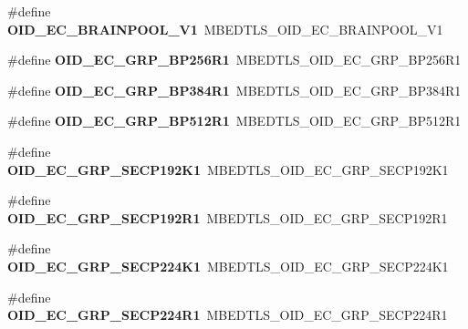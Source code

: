 \begin{DoxyCompactItemize}
\#define {\bfseries O\+I\+D\+\_\+\+E\+C\+\_\+\+B\+R\+A\+I\+N\+P\+O\+O\+L\+\_\+\+V1}~M\+B\+E\+D\+T\+L\+S\+\_\+\+O\+I\+D\+\_\+\+E\+C\+\_\+\+B\+R\+A\+I\+N\+P\+O\+O\+L\+\_\+\+V1
\item 
\mbox{\label{compat-1_83_8h_a672793a748d9f544a9f3c5b1cb5f151d}} 
\#define {\bfseries O\+I\+D\+\_\+\+E\+C\+\_\+\+G\+R\+P\+\_\+\+B\+P256\+R1}~M\+B\+E\+D\+T\+L\+S\+\_\+\+O\+I\+D\+\_\+\+E\+C\+\_\+\+G\+R\+P\+\_\+\+B\+P256\+R1
\item 
\mbox{\label{compat-1_83_8h_ae0e3218cfb47636b4fd43bd2ffefe111}} 
\#define {\bfseries O\+I\+D\+\_\+\+E\+C\+\_\+\+G\+R\+P\+\_\+\+B\+P384\+R1}~M\+B\+E\+D\+T\+L\+S\+\_\+\+O\+I\+D\+\_\+\+E\+C\+\_\+\+G\+R\+P\+\_\+\+B\+P384\+R1
\item 
\mbox{\label{compat-1_83_8h_adf93a0b60ff1f8d2ab31046b4c40f6d9}} 
\#define {\bfseries O\+I\+D\+\_\+\+E\+C\+\_\+\+G\+R\+P\+\_\+\+B\+P512\+R1}~M\+B\+E\+D\+T\+L\+S\+\_\+\+O\+I\+D\+\_\+\+E\+C\+\_\+\+G\+R\+P\+\_\+\+B\+P512\+R1
\item 
\mbox{\label{compat-1_83_8h_ab055d672f1db76103ef82d19581736b2}} 
\#define {\bfseries O\+I\+D\+\_\+\+E\+C\+\_\+\+G\+R\+P\+\_\+\+S\+E\+C\+P192\+K1}~M\+B\+E\+D\+T\+L\+S\+\_\+\+O\+I\+D\+\_\+\+E\+C\+\_\+\+G\+R\+P\+\_\+\+S\+E\+C\+P192\+K1
\item 
\mbox{\label{compat-1_83_8h_a1179f8818222df1e0eae894d6d19847a}} 
\#define {\bfseries O\+I\+D\+\_\+\+E\+C\+\_\+\+G\+R\+P\+\_\+\+S\+E\+C\+P192\+R1}~M\+B\+E\+D\+T\+L\+S\+\_\+\+O\+I\+D\+\_\+\+E\+C\+\_\+\+G\+R\+P\+\_\+\+S\+E\+C\+P192\+R1
\item 
\mbox{\label{compat-1_83_8h_aa237bd08aeec1d39392858889afe4864}} 
\#define {\bfseries O\+I\+D\+\_\+\+E\+C\+\_\+\+G\+R\+P\+\_\+\+S\+E\+C\+P224\+K1}~M\+B\+E\+D\+T\+L\+S\+\_\+\+O\+I\+D\+\_\+\+E\+C\+\_\+\+G\+R\+P\+\_\+\+S\+E\+C\+P224\+K1
\item 
\mbox{\label{compat-1_83_8h_aee64f23de1a5800296cec2344cacf2ff}} 
\#define {\bfseries O\+I\+D\+\_\+\+E\+C\+\_\+\+G\+R\+P\+\_\+\+S\+E\+C\+P224\+R1}~M\+B\+E\+D\+T\+L\+S\+\_\+\+O\+I\+D\+\_\+\+E\+C\+\_\+\+G\+R\+P\+\_\+\+S\+E\+C\+P224\+R1
\item 
\mbox{\label{compat-1_83_8h_a3635a4e65088e78421aeae7bd4e63d7f}} 

\end{DoxyCompactItemize}
